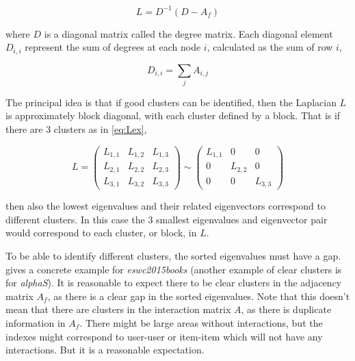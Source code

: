 \begin{equation}
    L = D^{-1}( D - A_f )
\end{equation}

where $D$ is a diagonal matrix called the degree matrix. Each diagonal element $D_{i, i}$ represent the sum of degrees at each node $i$, calculated as the sum of row $i$,

\begin{equation}
    D_{i, i} = \sum_j A_{i, j}
\end{equation}

The principal idea is that if good clusters can be identified, then the Laplacian $L$ is approximately block diagonal, with each cluster defined by a block. That is if there are 3 clusters as in \eqref{eq:Lex},

\begin{equation}\label{eq:Lex}
    L =
    \begin{pmatrix}
        L_{1, 1} & L_{1, 2} & L_{1, 3} \\
        L_{2, 1} & L_{2, 2} & L_{2, 3} \\
        L_{3, 1} & L_{3, 2} & L_{3, 3}
    \end{pmatrix}
    \sim
    \begin{pmatrix}
        L_{1, 1} & 0         & 0        \\
        0        & L_{2, 2}  & 0        \\
        0        & 0         & L_{3, 3}
    \end{pmatrix}
\end{equation}

then also the lowest eigenvalues and their related eigenvectors correspond to different clusters. In this case the 3 smallest eigenvalues and eigenvector pair would correspond to each cluster, or block, in $L$.

To be able to identify different clusters, the sorted eigenvalues must have a gap.  gives a concrete example for \textit{eswc2015books} (another example of clear clusters is  for \textit{alphaS}). It is reasonable to expect there to be clear clusters in the adjacency matrix $A_f$, as there is a clear gap in the sorted eigenvalues. Note that this doesn't mean that there are clusters in the interaction matrix $A$, as there is duplicate information in $A_f$. There might be large areas without interactions, but the indexes might correspond to user-user or item-item which will not have any interactions. But it is a reasonable expectation.

